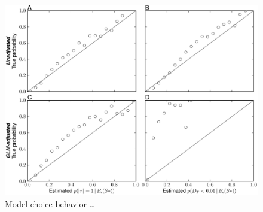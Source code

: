 \documentclass[letterpaper,12pt]{article}
\begin{document}
\begin{figure}[hbtp]
    \captionsetup{listformat=figList}
    \centering
    \includegraphics[width=1.0\textwidth]{../../validation/results/dpp/pymsbayes-results/plots/prior-dpp_prior-dpp_mc_behavior.pdf}
    \caption{
        Model-choice behavior \ldots
    }
    \label{fig_dpp_dpp_val_mc}
\end{figure}

\clearpage


\setcounter{figure}{0}
\setcounter{table}{0}
\setcounter{page}{1}

\singlespacing

\renewcommand{\refname}{\noindent\MakeUppercase{\LARGE\sffamily\upshape Supporting Information}}





\end{document}
